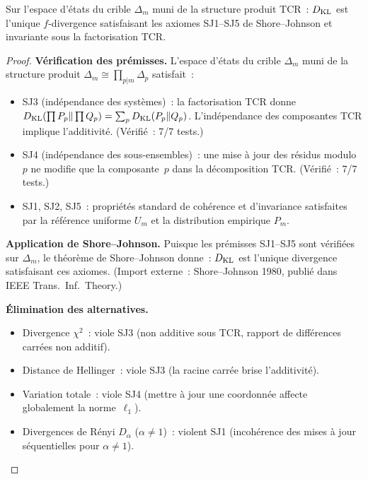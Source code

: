 \documentclass[12pt,a4paper]{article}
\begin{document}
\mTHM
\begin{theoreme}
\label{thm:G1}
Sur l'espace d'états du crible $\Delta_m$ muni de la structure produit
TCR~: $D_{\mathrm{KL}}$ est l'unique $f$-divergence satisfaisant les axiomes
SJ1--SJ5 de Shore--Johnson et invariante sous la factorisation TCR.

\begin{proof}
\textbf{Vérification des prémisses.} L'espace d'états du crible
$\Delta_m$ muni de la structure produit
$\Delta_m \cong \prod_{p|m} \Delta_p$ satisfait~:
\begin{itemize}
\item SJ3 (indépendance des systèmes)~: la factorisation TCR donne
  $D_{\mathrm{KL}}(\prod P_p \| \prod Q_p) = \sum_p D_{\mathrm{KL}}(P_p \| Q_p)$.
  L'indépendance des composantes TCR implique l'additivité.
  (Vérifié~: 7/7 tests.)
\item SJ4 (indépendance des sous-ensembles)~: une mise à jour des
  résidus modulo $p$ ne modifie que la composante~$p$ dans la
  décomposition TCR. (Vérifié~: 7/7 tests.)
\item SJ1, SJ2, SJ5~: propriétés standard de cohérence et d'invariance
  satisfaites par la référence uniforme $U_m$ et la distribution
  empirique $P_m$.
\end{itemize}

\textbf{Application de Shore--Johnson.} Puisque les prémisses
SJ1--SJ5 sont vérifiées sur $\Delta_m$, le théorème de Shore--Johnson
donne~: $D_{\mathrm{KL}}$ est l'unique divergence satisfaisant ces axiomes.
(Import externe~: Shore--Johnson 1980, publié dans IEEE
Trans.\ Inf.\ Theory.)

\textbf{Élimination des alternatives.}
\begin{itemize}
\item Divergence $\chi^2$~: viole SJ3 (non additive sous TCR, rapport
  de différences carrées non additif).
\item Distance de Hellinger~: viole SJ3 (la racine carrée brise
  l'additivité).
\item Variation totale~: viole SJ4 (mettre à jour une coordonnée
  affecte globalement la norme~$\ell_1$).
\item Divergences de R\'enyi $D_\alpha$ ($\alpha \neq 1$)~: violent SJ1
  (incohérence des mises à jour séquentielles pour $\alpha \neq 1$).
\end{itemize}
\end{proof}
\end{theoreme}
\end{document}
